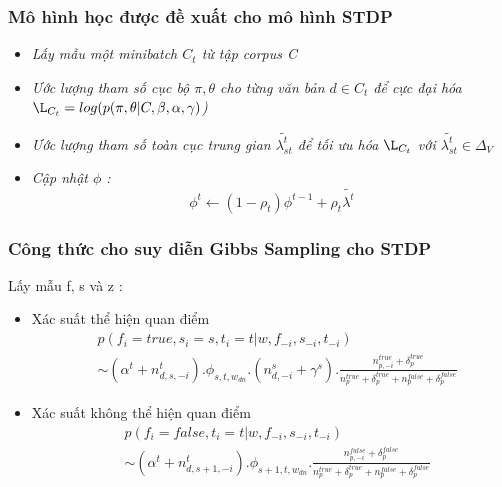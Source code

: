 \documentclass{beamer}
\begin{document}
\begin{frame}
\frametitle{Mô hình học được đề xuất cho mô hình STDP}
\begin{itemize}
\item \textit{Lấy mẫu một minibatch $C_t$ từ tập corpus C}
\item \textit{Ước lượng tham số cục bộ $\pi, \theta$ cho từng văn bản $d \in C_t$ để cực đại hóa $\L_{C_t} = log(p(\pi,\theta|C, \beta, \alpha, \gamma)$)}
\item \textit{Ước lượng tham số toàn cục trung gian $\tilde{\lambda_{st}^t}$ để tối ưu hóa $\L_{C_t}$ với $\tilde{\lambda_{st}^t} \in \Delta_V$}
\item \textit{Cập nhật $\phi$ : 
 \label{equal:update_phi}
 	\begin{equation}
		\phi^t \leftarrow (1 - \rho_t)\phi^{t-1} + \rho_t\tilde{\lambda^t}
	\end{equation}
}
\end{itemize}
\end{frame}


\begin{frame}[shrink=25]
\frametitle{Công thức cho suy diễn Gibbs Sampling cho STDP}
Lấy mẫu f, s và z : 
\begin{itemize}
\item Xác suất thể hiện quan điểm
\begin{equation}
\label{equal:sampling_true}
\begin{split}
&p(f_i=true,s_i=s,t_i=t|w, f_{-i}, s_{-i}, t_{-i})  \\ &\sim(\alpha^t + n_{d,s,-i}^t).\phi_{s,t,w_{dn}}.(n_{d,-i}^s+\gamma^s).\frac{n_{p,-i}^{true}+\delta_p^{true}}{n_p^{true} + \delta_p^{true} + n_p^{false} + \delta_p^{false} }
\end{split}
\end{equation}
\item Xác suất không thể hiện quan điểm
\begin{equation}
\label{equal:sampling_false}
\begin{split}
&p(f_i=false,t_i=t|w, f_{-i}, s_{-i}, t_{-i})  \\ &
\sim(\alpha^t + n_{d,s+1,-i}^t).\phi_{s+1,t,w_{dn}}.\frac{n_{p,-i}^{false}+\delta_p^{false}}{n_p^{true} + \delta_p^{true} + n_p^{false} + \delta_p^{false} }
\end{split}
\end{equation}
\end{itemize}
\end{frame}
\end{document}
